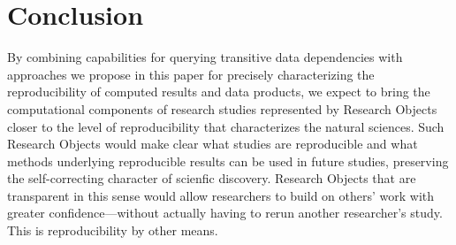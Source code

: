 \section{Conclusion}\label{sec-conclusion}

By combining capabilities for querying transitive data dependencies with
	approaches we propose in this paper for precisely characterizing the reproducibility
	of computed
	results and data products, we expect to bring the computational components of research
	studies represented by Research Objects
	closer to the level of reproducibility that characterizes the natural sciences.
Such Research Objects would make clear what studies are reproducible and what methods
	underlying reproducible
	results can be used in future studies, preserving the self-correcting character of
    scienfic discovery.
Research Objects that are transparent in this sense would allow researchers to build
	on others' work with greater confidence---without
	actually having to rerun another researcher's study.
This is reproducibility by other means.

